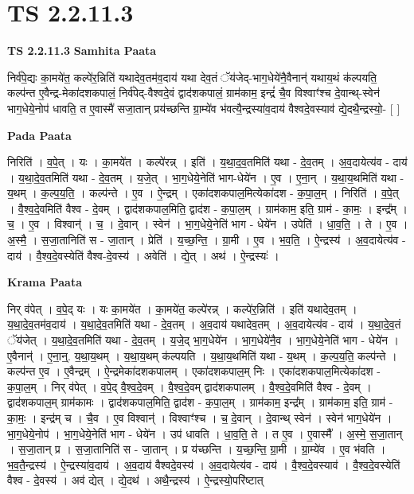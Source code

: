 \documentclass[17pt]{extarticle}
\begin{document}
\section*{ TS 2.2.11.3 }

\textbf{TS 2.2.11.3 } \newline
\textbf{Samhita Paata} \newline

निर्व॑पे॒द्यः का॒मये॑त॒ कल्पे॑र॒न्निति॑ यथादेव॒तम॑व॒दाय॑ यथा देव॒तं ॅय॑जेद्-भाग॒धेये॑नै॒वैनान्॑ यथाय॒थं क॑ल्पयति॒ कल्प॑न्त ए॒वैन्द्र-मेका॑दशकपालं॒ निर्व॑पेद्-वैश्वदे॒वं द्वाद॑शकपालं॒ ग्राम॑काम॒ इन्द्रं॑ चै॒व विश्वाꣳ॑श्च दे॒वान्थ्-स्वेन॑ भाग॒धेये॒नोप॑ धावति॒ त ए॒वास्मै॑ सजा॒तान् प्रय॑च्छन्ति ग्रा॒म्ये॑व भ॑वत्यै॒न्द्रस्या॑व॒दाय॑ वैश्वदे॒वस्याव॑ द्ये॒दथै॒न्द्रस्यो॒- [  ] \newline

\textbf{Pada Paata} \newline

निरिति॑ । व॒पे॒त् । यः । का॒मये॑त । कल्पे॑रन्न् । इति॑ । य॒था॒द॒व॒तमिति॑ यथा - दे॒व॒तम् । अ॒व॒दायेत्य॑व - दाय॑ । य॒था॒दे॒व॒तमिति॑ यथा - दे॒व॒तम् । य॒जे॒त् । भा॒ग॒धेये॒नेति॑ भाग-धेये॑न । ए॒व । ए॒ना॒न् । य॒था॒य॒थमिति॑ यथा - य॒थम् । क॒ल्प॒य॒ति॒ । कल्प॑न्ते । ए॒व । ऐ॒न्द्रम् । एका॑दशकपाल॒मित्येका॑दश - क॒पा॒ल॒म् । निरिति॑ । व॒पे॒त् । वै॒श्व॒दे॒वमिति॑ वैश्व - दे॒वम् । द्वाद॑शकपाल॒मिति॒ द्वाद॑श - क॒पा॒ल॒म् । ग्राम॑काम॒ इति॒ ग्राम॑ - का॒मः॒ । इन्द्र᳚म् । च॒ । ए॒व । विश्वान्॑ । च॒ । दे॒वान् । स्वेन॑ । भा॒ग॒धेये॒नेति॑ भाग - धेये॑न । उपेति॑ । धा॒व॒ति॒ । ते । ए॒व । अ॒स्मै॒ । स॒जा॒तानिति॑ स - जा॒तान् । प्रेति॑ । य॒च्छ॒न्ति॒ । ग्रा॒मी । ए॒व । भ॒व॒ति॒ । ऐ॒न्द्रस्य॑ । अ॒व॒दायेत्य॑व - दाय॑ । वै॒श्व॒दे॒वस्येति॑ वैश्व-दे॒वस्य॑ । अवेति॑ । द्ये॒त् । अथ॑ । ऐ॒न्द्रस्यः॑ ।  \newline


\textbf{Krama Paata} \newline

निर् व॑पेत् । व॒पे॒द् यः । यः का॒मये॑त । का॒मये॑त॒ कल्पे॑रन्न् । कल्पे॑र॒न्निति॑ । इति॑ यथादेव॒तम् । य॒था॒दे॒व॒तम॑व॒दाय॑ । य॒था॒दे॒व॒तमिति॑ यथा - दे॒व॒तम् । अ॒व॒दाय॑ यथादेव॒तम् । अ॒व॒दायेत्य॑व - दाय॑ । य॒था॒दे॒व॒तं ॅय॑जेत् । य॒था॒दे॒व॒तमिति॑ यथा - दे॒व॒तम् । य॒जे॒द् भा॒ग॒धेये॑न । भा॒ग॒धेये॑नै॒व । भा॒ग॒धेये॒नेति॑ भाग - धेये॑न । ए॒वैनान्॑ । ए॒ना॒न्॒. य॒था॒य॒थम् । य॒था॒य॒थम् क॑ल्पयति । य॒था॒य॒थमिति॑ यथा - य॒थम् । क॒ल्प॒य॒ति॒ कल्प॑न्ते । कल्प॑न्त ए॒व । ए॒वैन्द्रम् । ऐ॒न्द्रमेका॑दशकपालम् । एका॑दशकपाल॒म् निः । एका॑दशकपाल॒मित्येका॑दश - क॒पा॒ल॒म् । निर् व॑पेत् । व॒पे॒द् वै॒श्व॒दे॒वम् । वै॒श्व॒दे॒वम् द्वाद॑शकपालम् । वै॒श्व॒दे॒वमिति॑ वैश्व - दे॒वम् । द्वाद॑शकपाल॒म् ग्राम॑कामः । द्वाद॑शकपाल॒मिति॒ द्वाद॑श - क॒पा॒ल॒म् । ग्राम॑काम॒ इन्द्र᳚म् । ग्राम॑काम॒ इति॒ ग्राम॑ - का॒मः॒ । इन्द्र॑म् च । चै॒व । ए॒व विश्वान्॑ । विश्वाꣳ॑श्च । च॒ दे॒वान् । दे॒वान्थ् स्वेन॑ । स्वेन॑ भाग॒धेये॑न । भा॒ग॒धेये॒नोप॑ । भा॒ग॒धेये॒नेति॑ भाग - धेये॑न । उप॑ धावति । धा॒व॒ति॒ ते । त ए॒व । ए॒वास्मै᳚ । अ॒स्मे॒ स॒जा॒तान् । स॒जा॒तान् प्र । स॒जा॒तानिति॑ स - जा॒तान् । प्र य॑च्छन्ति । य॒च्छ॒न्ति॒ ग्रा॒मी । ग्रा॒म्ये॑व । ए॒व भ॑वति । भ॒व॒तै॒न्द्रस्य॑ । ऐ॒न्द्रस्या॑व॒दाय॑ । अ॒व॒दाय॑ वैश्वदे॒वस्य॑ । अ॒व॒दायेत्य॑व - दाय॑ । वै॒श्व॒दे॒वस्याव॑ । वै॒श्व॒दे॒वस्येति॑ वैश्व - दे॒वस्य॑ । अव॑ द्येत् । द्ये॒दथ॑ । अथै॒न्द्रस्य॑ । ऐ॒न्द्रस्यो॒परि॑ष्टात् \newline
\end{document}
